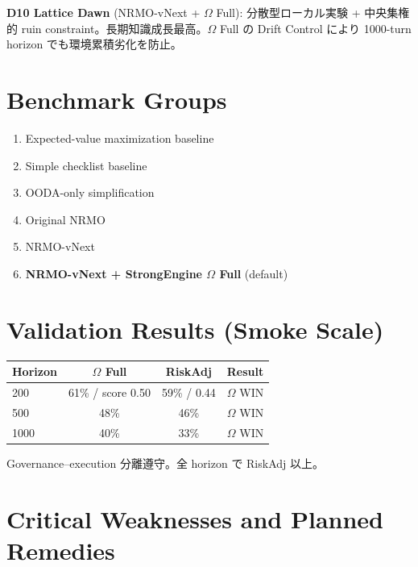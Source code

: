 \documentclass[11pt,a4paper]{article}
\theoremstyle{definition}\newtheorem{definition}{Definition}[section]
\begin{document}
\textbf{D10 Lattice Dawn} (NRMO-vNext + $\Omega$ Full): 分散型ローカル実験 + 中央集権的 ruin constraint。長期知識成長最高。$\Omega$ Full の Drift Control により 1000-turn horizon でも環境累積劣化を防止。


\section{Benchmark Groups}

\begin{enumerate}[leftmargin=2em]
  \item Expected-value maximization baseline
  \item Simple checklist baseline
  \item OODA-only simplification
  \item Original NRMO
  \item NRMO-vNext
  \item \textbf{NRMO-vNext + StrongEngine $\Omega$ Full} (default)
\end{enumerate}


\section{Validation Results (Smoke Scale)}

\begin{resultbox}
\begin{tabular}{@{}lccl@{}}\toprule
Horizon & $\Omega$ Full & RiskAdj & Result\\\midrule
200 & 61\% / score 0.50 & 59\% / 0.44 & $\Omega$ WIN\\
500 & 48\% & 46\% & $\Omega$ WIN\\
1000 & 40\% & 33\% & $\Omega$ WIN\\
\bottomrule\end{tabular}

Governance--execution 分離遵守。全 horizon で RiskAdj 以上。
\end{resultbox}


\section{Critical Weaknesses and Planned Remedies}
\end{document}
